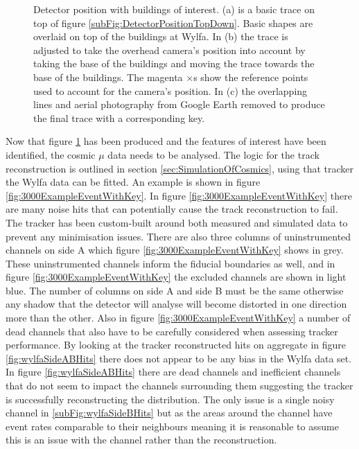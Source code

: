 \begin{figure}[!h]
\begin{subfigure}{1.0\textwidth}
  \captionsetup{width=.9\linewidth}
  \caption{}
  \label{subFig:wylfaTraceStep4}
\end{subfigure}
\caption{Detector position with buildings of interest. (a) is a basic trace on top of figure \ref{subFig:DetectorPositionTopDown}. Basic shapes are overlaid on top of the buildings at Wylfa. In (b) the trace is adjusted to take the overhead camera's position into account by taking the base of the buildings and moving the trace towards the base of the buildings. The magenta $\times$s show the reference points used to account for the camera's position. In (c) the overlapping lines and aerial photography from Google Earth removed to produce the final trace with a corresponding key.}
\label{fig:wylfaTraceSteps1-4}
\end{figure}


Now that figure \ref{subFig:wylfaTraceStep4} has been produced and the features of interest have been identified, the cosmic $\mu$ data needs to be analysed. The logic for the track reconstruction is outlined in section \ref{sec:SimulationOfCosmics}, using that tracker the Wylfa data can be fitted. An example is shown in figure \ref{fig:3000ExampleEventWithKey}. In figure \ref{fig:3000ExampleEventWithKey} there are many noise hits that can potentially cause the track reconstruction to fail. The tracker has been custom-built around both measured and simulated data to prevent any minimisation issues. There are also three columns of uninstrumented channels on side A which figure \ref{fig:3000ExampleEventWithKey} shows in grey. These uninstrumented channels inform the fiducial boundaries as well, and in figure \ref{fig:3000ExampleEventWithKey} the excluded channels are shown in light blue. The number of columns on side A and side B must be the same otherwise any shadow that the detector will analyse will become distorted in one direction more than the other. Also in figure \ref{fig:3000ExampleEventWithKey} a number of dead channels that also have to be carefully considered when assessing tracker performance. By looking at the tracker reconstructed hits on aggregate in figure \ref{fig:wylfaSideABHits} there does not appear to be any bias in the Wylfa data set. In figure \ref{fig:wylfaSideABHits} there are dead channels and inefficient channels that do not seem to impact the channels surrounding them suggesting the tracker is successfully reconstructing the distribution. The only issue is a single noisy channel in \ref{subFig:wylfaSideBHits} but as the areas around the channel have event rates comparable to their neighbours meaning it is reasonable to assume this is an issue with the channel rather than the reconstruction. 

